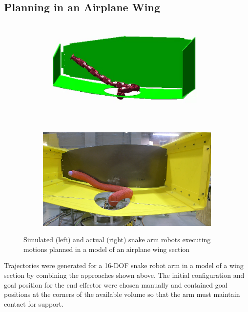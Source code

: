 \documentclass[../thesis.tex]{subfiles}
\begin{document}
\subsection{Planning in an Airplane Wing}
\begin{figure}
  \centering
  \begin{subfigure}[b]{.48\linewidth}
    \includegraphics[width=\linewidth]{./Planning/simulated_snake_in_wing.png}
  \end{subfigure}
  \begin{subfigure}[b]{.48\linewidth}
    \includegraphics[width=\linewidth]{./Planning/real_snake_in_wing.png}
  \end{subfigure}
  
  \caption{Simulated (left) and actual (right) snake arm robots executing motions planned in a model of an airplane wing section}
  \label{fig:snake_in_wing}
\end{figure}

Trajectories were generated for a 16-DOF snake robot arm in a model of a wing section by combining the approaches shown above.
The initial configuration and goal position for the end effector were chosen manually and contained goal positions at the corners of the available volume so that the arm must maintain contact for support.
\end{document}
